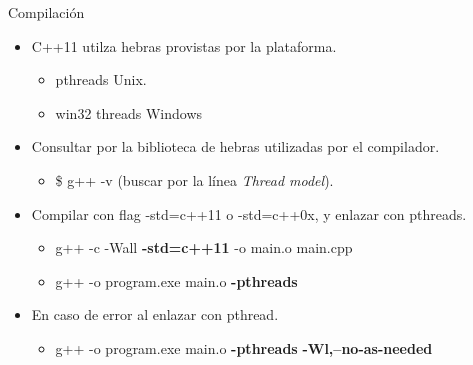 \begin{frame}{Compilación}
\begin{itemize}
  \item C++11 utilza hebras provistas por la plataforma.
  \begin{itemize}
    \item pthreads Unix.
    \item win32 threads Windows
  \end{itemize}
  \item Consultar por la biblioteca de hebras utilizadas por el compilador.
  \begin{itemize}
    \item \$ g++ -v (buscar por la línea \textit{Thread model}).
  \end{itemize}
  \vfill
  \item Compilar con flag -std=c++11 o -std=c++0x, y enlazar con pthreads.
  \begin{itemize}
    \item g++ -c -Wall \textbf{-std=c++11} -o main.o main.cpp
    \item g++ -o program.exe main.o \textbf{-pthreads}
  \end{itemize}
  \item En caso de error al enlazar con pthread.
  \begin{itemize}
    \item g++ -o program.exe main.o \textbf{-pthreads} \textbf{-Wl,--no-as-needed}
  \end{itemize}
\end{itemize}
\end{frame}